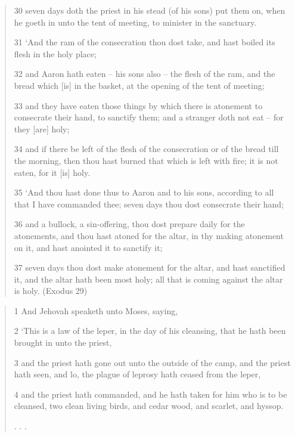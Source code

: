 \documentclass[11pt]{article}
\begin{document}
\begin{quote}
30 seven days doth the priest in his stead (of his sons) put them on, when he goeth in unto the tent of meeting, to minister in the sanctuary.

31 `And the ram of the consecration thou dost take, and hast boiled its flesh in the holy place;

32 and Aaron hath eaten -- his sons also -- the flesh of the ram, and the bread which [is] in the basket, at the opening of the tent of meeting;

33 and they have eaten those things by which there is atonement to consecrate their hand, to sanctify them; and a stranger doth not eat -- for they [are] holy;

34 and if there be left of the flesh of the consecration or of the bread till the morning, then thou hast burned that which is left with fire; it is not eaten, for it [is] holy.

35 `And thou hast done thus to Aaron and to his sons, according to all that I have commanded thee; seven days thou dost consecrate their hand;

36 and a bullock, a sin-offering, thou dost prepare daily for the atonements, and thou hast atoned for the altar, in thy making atonement on it, and hast anointed it to sanctify it;

37 seven days thou dost make atonement for the altar, and hast sanctified it, and the altar hath been most holy; all that is coming against the altar is holy.
(Exodus 29)
\end{quote}
\begin{quote}
1 And Jehovah speaketh unto Moses, saying,

2 `This is a law of the leper, in the day of his cleansing, that he hath been brought in unto the priest,

3 and the priest hath gone out unto the outside of the camp, and the priest hath seen, and lo, the plague of leprosy hath ceased from the leper,

4 and the priest hath commanded, and he hath taken for him who is to be cleansed, two clean living birds, and cedar wood, and scarlet, and hyssop.

. . . 

\end{quote}

\iffalse
\end{document}
